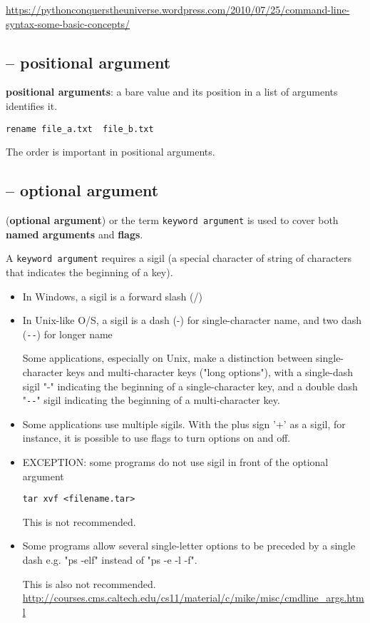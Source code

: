 \url{https://pythonconquerstheuniverse.wordpress.com/2010/07/25/command-line-syntax-some-basic-concepts/}


\subsection{-- positional argument}
\label{sec:positional-argument}

{\bf positional arguments}: a bare value and its position in a list of
  arguments identifies it.
\begin{verbatim}
rename file_a.txt  file_b.txt
\end{verbatim}  
The order is important in positional arguments.

\subsection{-- optional argument}
\label{sec:optional-argument}

({\bf optional argument}) or the term \verb!keyword argument! is used to
  cover both {\bf named arguments} and {\bf flags}.
  
A \verb!keyword argument! requires a sigil (a special character of string of
characters that indicates the beginning of a key).

\begin{itemize}
  \item In Windows, a sigil is a forward slash (/)
  \item In Unix-like O/S, a sigil is a dash (-) for single-character name, and
  two dash (\verb!--!) for longer name

Some applications, especially on Unix, make a distinction between
single-character keys and multi-character keys ("long options"), with a
single-dash sigil "-" indicating the beginning of a single-character key, and a
double dash "\verb!--!" sigil indicating the beginning of a multi-character key.

  \item Some applications use multiple sigils.  With the plus sign '+' as a
  sigil, for instance, it is possible to use flags to turn options on and off.
    
   \item EXCEPTION: some programs do not use sigil in front of the optional
   argument

\begin{verbatim}
tar xvf <filename.tar>
\end{verbatim}
This is not recommended.
   
   \item  Some programs allow several single-letter options to be preceded by a
   single dash e.g. "ps -elf" instead of "ps -e -l -f". 
   
   This is also not recommended.
   \url{http://courses.cms.caltech.edu/cs11/material/c/mike/misc/cmdline_args.html}
\end{itemize}

